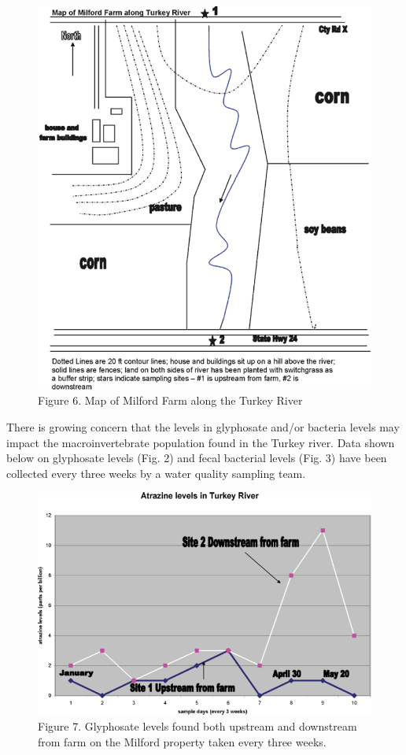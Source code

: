 \documentclass[
]{book}
\begin{document}
\begin{figure}
\centering
\includegraphics{images/figure6.png}
\caption{Figure 6. Map of Milford Farm along the Turkey River}
\end{figure}

There is growing concern that the levels in glyphosate and/or bacteria levels may impact the macroinvertebrate population found in the Turkey river. Data shown below on glyphosate levels (Fig. 2) and fecal bacterial levels (Fig. 3) have been collected every three weeks by a water quality sampling team.

\begin{figure}
\centering
\includegraphics{images/figure7.png}
\caption{Figure 7. Glyphosate levels found both upstream and downstream from farm on the Milford property taken every three weeks.}
\end{figure}
\end{document}
